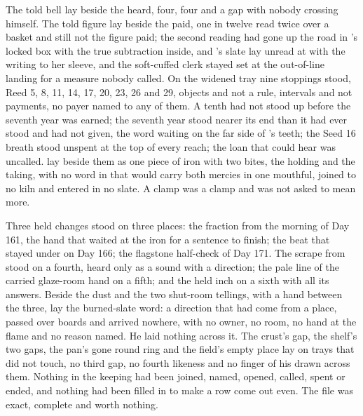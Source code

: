 The told bell lay beside the heard, four, four and a gap with nobody crossing himself. The told figure lay beside the paid, one in twelve read twice over a basket and still not the figure paid; the second reading had gone up the road in 's locked box with the true subtraction inside, and 's slate lay unread at  with the writing to her sleeve, and the soft-cuffed clerk stayed set at the out-of-line landing for a measure nobody called. On the widened tray nine stoppings stood, Reed 5, 8, 11, 14, 17, 20, 23, 26 and 29, objects and not a rule, intervals and not payments, no payer named to any of them. A tenth had not stood up before the seventh year was earned; the seventh year stood nearer its end than it had ever stood and had not given, the word waiting on the far side of 's teeth; the Seed 16 breath stood unspent at the top of every reach; the loan that could hear was uncalled.  lay beside them as one piece of iron with two bites, the holding and the taking, with no word in  that would carry both mercies in one mouthful, joined to no kiln and entered in no slate. A clamp was a clamp and was not asked to mean more.

Three held changes stood on three places: the fraction from the morning of Day 161, the hand that waited at the iron for a sentence to finish; the beat that stayed under  on Day 166; the flagstone half-check of Day 171. The scrape from  stood on a fourth, heard only as a sound with a direction; the pale line of the carried glaze-room hand on a fifth; and the held inch on a sixth with all its answers. Beside the dust and the two shut-room tellings, with a hand between the three, lay the burned-slate word: a direction that had come from a place, passed over boards and arrived nowhere, with no owner, no room, no hand at the flame and no reason named. He laid nothing across it. The crust's gap, the shelf's two gaps, the pan's gone round ring and the field's empty place lay on trays that did not touch, no third gap, no fourth likeness and no finger of his drawn across them. Nothing in the keeping had been joined, named, opened, called, spent or ended, and nothing had been filled in to make a row come out even. The file was exact, complete and worth nothing.

\scenebreak

